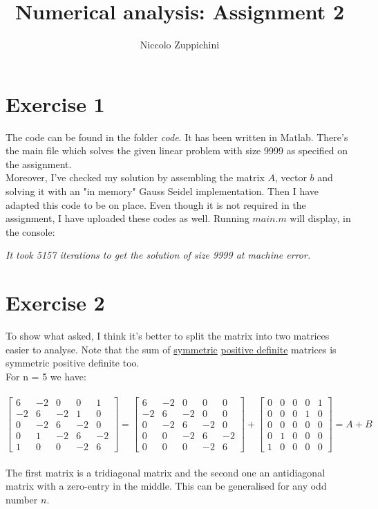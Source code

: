 \documentclass[12pt]{article}
\title{Numerical analysis: Assignment 2}
\author{Niccolo Zuppichini}
\begin{document}
\maketitle
\section*{Exercise 1}

The code can be found in the folder \textit{code}. It has been written in Matlab. There's the main file which solves the given linear problem with size 9999 as specified on the assignment. \\

Moreover, I've checked my solution by assembling the matrix $A$, vector $b$ and solving it with an "in memory" Gauss Seidel implementation. Then I have adapted this code to be on place. Even though it is not required in the assignment, I have uploaded these codes as well. Running $main.m$ will display, in the console: \\
\begin{center}
	\textit{It took 5157 iterations to get the solution of size 9999 at machine error.}
\end{center}

\section*{Exercise 2}

To show what asked, I think it's better to split the matrix into two matrices easier to analyse. Note that the sum of \hyperref[sec:proof_sym]{symmetric} \hyperref[sec:proof_pd]{positive definite} matrices is symmetric positive definite too. \\
For n = 5 we have: \\
\\
$
\begin{bmatrix}
	6 & -2 & 0 & 0  & 1 \\
	-2 & 6 & -2 & 1 & 0 \\
	0 & -2 & 6 & -2 & 0\\
	0 & 1 & -2 & 6 & -2  \\
	 1 & 0 & 0 & -2 & 6 
\end{bmatrix}
 = 
 \begin{bmatrix}
	6 & -2 & 0 & 0  & 0 \\
	-2 & 6 & -2 & 0 & 0 \\
	0 & -2 & 6 & -2 & 0\\
	0 & 0 & -2 & 6 & -2  \\
	 0 & 0 & 0 & -2 & 6 
\end{bmatrix}
+ 
\begin{bmatrix}
	0 & 0 & 0 & 0  & 1 \\
	0 & 0 & 0 & 1 & 0 \\
	0 & 0 & 0 & 0 & 0\\
	0 & 1 & 0 & 0 & 0  \\
	 1 & 0 & 0 & 0 & 0 
\end{bmatrix}
= A + B 
$
\\
\\
The first matrix is a tridiagonal matrix and the second one an antidiagonal matrix with a zero-entry in the middle. This can be generalised for any odd number $n$. \\ 
\end{document}
